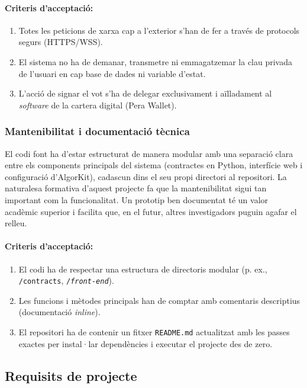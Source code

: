 \paragraph{Criteris d'acceptació:}
\begin{enumerate}[label=\roman*.]
    \item Totes les peticions de xarxa cap a l'exterior s'han de fer a través de protocols segurs (HTTPS/WSS).
    \item El sistema no ha de demanar, transmetre ni emmagatzemar la clau privada de l'usuari en cap base de dades ni variable d'estat.
    \item L'acció de signar el vot s'ha de delegar exclusivament i aïlladament al \textit{software} de la cartera digital (Pera Wallet).
\end{enumerate}

\subsubsection{Mantenibilitat i documentació tècnica}

El codi font ha d'estar estructurat de manera modular amb una separació clara entre els components principals del sistema (contractes en Python, interfície web i configuració d'AlgorKit), cadascun dins el seu propi directori al repositori.
La naturalesa formativa d'aquest projecte fa que la mantenibilitat sigui tan important com la funcionalitat. Un prototip ben documentat té un valor acadèmic superior i facilita que, en el futur, altres investigadors puguin agafar el relleu.

\paragraph{Criteris d'acceptació:}
\begin{enumerate}[label=\roman*.]
    \item El codi ha de respectar una estructura de directoris modular (p. ex., \texttt{/contracts}, \texttt{/\textit{front-end}}).
    \item Les funcions i mètodes principals han de comptar amb comentaris descriptius (documentació \textit{inline}).
    \item El repositori ha de contenir un fitxer \texttt{README.md} actualitzat amb les passes exactes per instal·lar dependències i executar el projecte des de zero.
\end{enumerate}

\subsection{Requisits de projecte}

